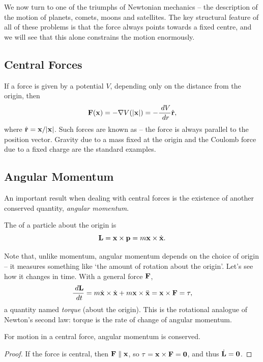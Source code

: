 \documentclass[a4paper]{scrartcl}
\newcommand{\hh}[1]{\hat{\vv{#1}}}
\begin{document}
We now turn to one of the triumphs of Newtonian mechanics -- the description of the motion of planets, comets, moons and satellites. The key structural feature of all of these problems is that the force always points towards a fixed centre, and we will see that this alone constrains the motion enormously.

\subsection{Central Forces}

If a force is given by a potential $V$, depending only on the distance from the origin, then
$$
\vv F(\vv x) = - \nabla V(|\vv x|) = - \frac{\dd V}{\dd r} \hh r,
$$
where $\hh r = \vv x/|\vv x|$. Such forces are known as  -- the force is always parallel to the position vector. Gravity due to a mass fixed at the origin and the Coulomb force due to a fixed charge are the standard examples.

\subsection{Angular Momentum}

An important result when dealing with central forces is the existence of another conserved quantity, \emph{angular momentum}.

\begin{definition}
	The  of a particle about the origin is
	$$
	\mathbf{L} = \mathbf{x} \times \mathbf{p} = m \mathbf{x} \times \dot{\mathbf{x}}.
	$$
\end{definition}

Note that, unlike momentum, angular momentum depends on the choice of origin -- it measures something like `the amount of rotation about the origin'. Let's see how it changes in time. With a general force $\mathbf{F}$,
$$
\frac{\; d \mathbf{L}}{\; d t} = m\dot{\mathbf{x}} \times \dot{\mathbf{x}} + m \mathbf{x} \times \ddot{\mathbf{x}} = \mathbf{x} \times \mathbf{F} = \mathbf{\tau},
$$
a quantity named \emph{torque} (about the origin). This is the rotational analogue of Newton's second law: torque is the rate of change of angular momentum.

\begin{proposition}
	For motion in a central force, angular momentum is conserved.
\end{proposition}
\begin{proof}
	If the force is central, then $\mathbf{F} \parallel \mathbf{x}$, so $\mathbf{\tau} = \mathbf{x} \times \mathbf{F} = \mathbf{0}$, and thus $\dot{\mathbf{L}} = \mathbf{0}$.
\end{proof}
\end{document}
